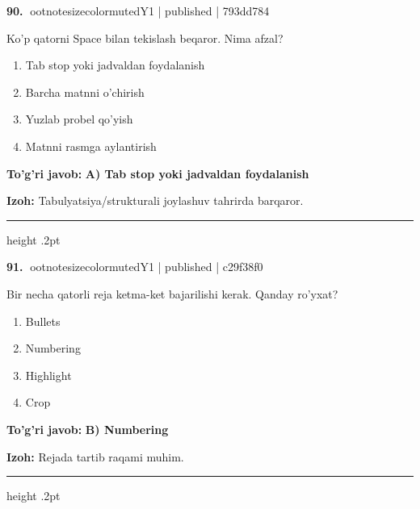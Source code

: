 \documentclass[10pt,a4paper]{article}
\begin{document}
\textbf{\color{ink}90.} {ootnotesizecolor{muted}Y1 | published | 793dd784}
\par
Ko'p qatorni Space bilan tekislash beqaror. Nima afzal?
\begin{enumerate}[label=\Alph*),leftmargin=9mm]
\item Tab stop yoki jadvaldan foydalanish
\item Barcha matnni o'chirish
\item Yuzlab probel qo'yish
\item Matnni rasmga aylantirish
\end{enumerate}
\begin{tcolorbox}[enhanced,breakable,colback=teal!4,colframe=teal!55!black,boxrule=0.45pt,arc=1.2mm,left=2.8mm,right=2.8mm,top=2mm,bottom=2mm]
\textbf{\color{teal}To'g'ri javob:} \textbf{A) Tab stop yoki jadvaldan foydalanish}
\par\smallskip
\textbf{Izoh:} Tabulyatsiya/strukturali joylashuv tahrirda barqaror.
\end{tcolorbox}
\vspace{2mm}\hrule height .2pt\vspace{2mm}

\textbf{\color{ink}91.} {ootnotesizecolor{muted}Y1 | published | c29f38f0}
\par
Bir necha qatorli reja ketma-ket bajarilishi kerak. Qanday ro'yxat?
\begin{enumerate}[label=\Alph*),leftmargin=9mm]
\item Bullets
\item Numbering
\item Highlight
\item Crop
\end{enumerate}
\begin{tcolorbox}[enhanced,breakable,colback=teal!4,colframe=teal!55!black,boxrule=0.45pt,arc=1.2mm,left=2.8mm,right=2.8mm,top=2mm,bottom=2mm]
\textbf{\color{teal}To'g'ri javob:} \textbf{B) Numbering}
\par\smallskip
\textbf{Izoh:} Rejada tartib raqami muhim.
\end{tcolorbox}
\vspace{2mm}\hrule height .2pt\vspace{2mm}
\end{document}
